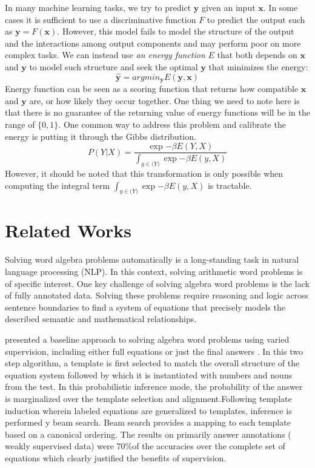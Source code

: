 \documentclass[11pt,letterpaper]{article}
\begin{document}
In many machine learning tasks, we try to predict $\textbf{y}$ given an input $\textbf{x}$. In some cases it is sufficient to use a discriminative function $F$ to predict the output such as $\textbf{y} = F( \textbf{x} )$. However, this model fails to model the structure of the output and the interactions among output components and may perform poor on more complex tasks. We can instead use \textit{an energy function} $E$ that both depends on $\textbf{x}$ and $\textbf{y}$ to model such structure and seek the optimal $\textbf{y}$ that minimizes the energy:
\begin{equation}
\hat{\mathbf{y}} = argmin_{\mathbf{y}} E( \mathbf{y}, \mathbf{x} )%
\label{ebm0}
\end{equation}
Energy function can be seen as a scoring function that returns how compatible $\mathbf{x}$ and $\mathbf{y}$ are, or how likely they occur together.
One thing we need to note here is that there is no guarantee of the returning value of energy functions will be in the range of $\{ 0, 1\}$. One common way to address this problem and calibrate the energy is putting it through the Gibbs distribution.
\begin{equation}
P(Y|X) = \frac{ \exp{- \beta E(Y, X)} }{\int_{y \in \mathcal(Y)} \exp{- \beta E(y, X)}  }
\label{ebm1}
\end{equation}
However, it should be noted that this transformation is only possible when computing the integral term $\int_{y \in \mathcal(Y)} \exp{- \beta E(y, X)}$ is tractable.
\section{Related Works}
Solving word algebra problems automatically is a long-standing task in natural language processing (NLP). In this context, solving arithmetic word problems is of specific interest. One key challenge of solving algebra word problems is the lack of fully annotated data. Solving these problems require reasoning and logic across sentence boundaries to find a system of equations that precisely models the described semantic and mathematical relationships.

\citep{Kushman2014LearningTA} presented a baseline approach to solving algebra word problems using varied supervision, including either full equations or just the final answers . In this two step algorithm,  a template is first selected to match the overall structure of the equation system followed by which it is instantiated with numbers and nouns from the test. In this probabilistic inference mode, the probability of the answer is marginalized over the template selection and alignment.Following template induction wherein labeled equations are generalized to templates, inference is performed y beam search. Beam search provides a mapping to each template based on a canonical ordering. The results on primarily answer annotations ( weakly supervised data) were 70\%of the accuracies over the complete set of equations which clearly justified the benefits of supervision. 
\end{document}
